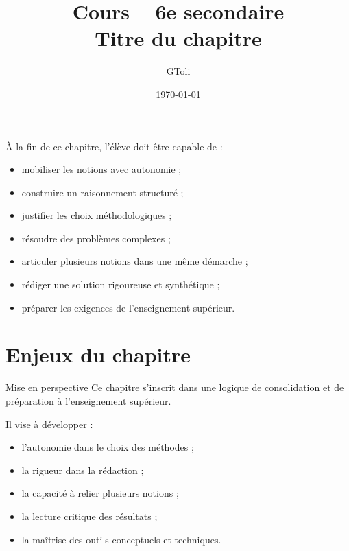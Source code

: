 \documentclass[11pt,a4paper]{article}
\title{\textbf{Cours -- 6e secondaire}\\[0.2cm]
\large Titre du chapitre}
\author{GToli}
\date{\today}
\begin{document}
\maketitle


\begin{cadreobjectif}
À la fin de ce chapitre, l’élève doit être capable de :
\begin{itemize}
    \item mobiliser les notions avec autonomie ;
    \item construire un raisonnement structuré ;
    \item justifier les choix méthodologiques ;
    \item résoudre des problèmes complexes ;
    \item articuler plusieurs notions dans une même démarche ;
    \item rédiger une solution rigoureuse et synthétique ;
    \item préparer les exigences de l’enseignement supérieur.
\end{itemize}
\end{cadreobjectif}

\section{Enjeux du chapitre}

\begin{cadrebleu}{Mise en perspective}
Ce chapitre s’inscrit dans une logique de consolidation et de préparation à l’enseignement supérieur.

Il vise à développer :
\begin{itemize}
    \item l’autonomie dans le choix des méthodes ;
    \item la rigueur dans la rédaction ;
    \item la capacité à relier plusieurs notions ;
    \item la lecture critique des résultats ;
    \item la maîtrise des outils conceptuels et techniques.
\end{itemize}
\end{cadrebleu}

\end{document}
